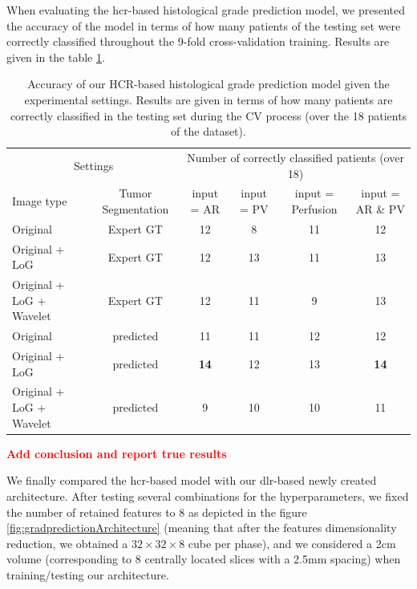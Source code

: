 \documentclass[]{article}
\renewcommand{\arraystretch}{5}
\newcommand{\todo}[1]{{\textcolor{red}{\textbf{#1}}}}
\begin{document}
When evaluating the \ac{hcr}-based histological grade prediction model, we presented the accuracy of the model in terms of how many patients of the testing set were correctly classified throughout the 9-fold cross-validation training. Results are given in the table \ref{tab:hcrGrade}.
\renewcommand{\arraystretch}{2}
\begin{table}[!htp]
	\centering
	\caption{Accuracy of our HCR-based histological grade prediction model given the experimental settings. Results are given in terms of how many patients are correctly classified in the testing set during the CV process (over the 18 patients of the dataset).}\label{tab:hcrGrade}
	\scriptsize
	\begin{tabular}{lccccc}\toprule
		\multicolumn{2}{c}{Settings} &\multicolumn{4}{c}{Number of correctly classified patients (over 18)} \\\cmidrule{1-6}
		Image type &Tumor Segmentation & input = AR &input = PV &input = Perfusion & input = AR \& PV \\\midrule
		Original & Expert GT & 12  & 8  & 11 & 12 \\
		Original + LoG & Expert GT & 12  & 13  & 11 & 13 \\
		Original + LoG + Wavelet & Expert GT & 12  & 11  & 9 & 13 \\
		Original & predicted & 11  & 11  & 12 & 12 \\
		Original + LoG & predicted & \textbf{14}  & 12  & 13 & \textbf{14} \\
		Original + LoG + Wavelet & predicted & 9  & 10  & 10 & 11 \\
		\bottomrule
	\end{tabular}
\end{table}
\renewcommand{\arraystretch}{5}

\todo{Add conclusion and report true results}


We finally compared the \ac{hcr}-based model with our \ac{dlr}-based newly created architecture.
After testing several combinations for the hyperparameters, we
fixed the number of retained features to 8 as depicted in the
figure \ref{fig:gradpredictionArchitecture} (meaning that after the features dimensionality reduction,
we obtained a $ 32\times32\times8 $ cube per phase), and we considered a 2cm volume
(corresponding to 8 centrally located slices with a 2.5mm spacing) when
training/testing our architecture.
\end{document}
